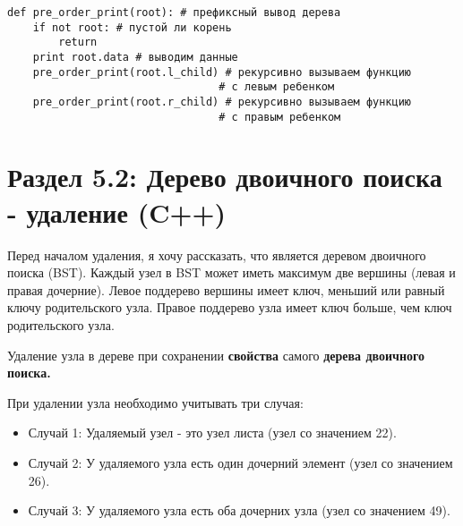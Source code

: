 \vspace{\baselineskip}
\begin{tcolorbox}
\begin{verbatim}
def pre_order_print(root): # префиксный вывод дерева
	if not root: # пустой ли корень
		return
	print root.data # выводим данные
	pre_order_print(root.l_child) # рекурсивно вызываем функцию 
								 # с левым ребенком
	pre_order_print(root.r_child) # рекурсивно вызываем функцию 
								 # с правым ребенком

\end{verbatim}
\end{tcolorbox}

\vspace{\baselineskip}

\vspace{\baselineskip}
\section*{Раздел 5.2: Дерево двоичного поиска - удаление (C++)}

\vspace{\baselineskip}
Перед началом удаления, я хочу рассказать, что является деревом двоичного поиска (BST). Каждый узел в BST может иметь максимум две вершины (левая и правая дочерние). Левое поддерево вершины имеет ключ, меньший или равный ключу родительского узла. Правое поддерево узла имеет ключ больше, чем ключ родительского узла.

\vspace{\baselineskip}
Удаление узла в дереве при сохранении {\bfseries свойства} самого {\bfseries дерева двоичного поиска.}

\vspace{\baselineskip}

\vspace{\baselineskip}
При удалении узла необходимо учитывать три случая:

\vspace{\baselineskip}
\begin{itemize}
  \item Случай 1: Удаляемый узел - это узел листа (узел со значением 22).
  \item Случай 2: У удаляемого узла есть один дочерний элемент (узел со значением 26). 
  \item Случай 3: У удаляемого узла есть оба дочерних узла (узел со значением 49).
\end{itemize}

